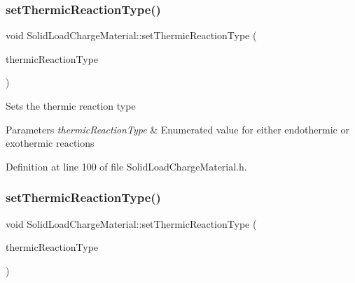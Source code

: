 \subsubsection{\texorpdfstring{set\+Thermic\+Reaction\+Type()}{setThermicReactionType()}\hspace{0.1cm}{\footnotesize\ttfamily [2/3]}}
{\footnotesize\ttfamily void Solid\+Load\+Charge\+Material\+::set\+Thermic\+Reaction\+Type (\begin{DoxyParamCaption}\item[{\hyperlink{class_load_charge_material_a51d4263e865a5d86236622dd3fe23fd1}{Load\+Charge\+Material\+::\+Thermic\+Reaction\+Type}}]{thermic\+Reaction\+Type }\end{DoxyParamCaption})\hspace{0.3cm}{\ttfamily [inline]}}

Sets the thermic reaction type 
\begin{DoxyParams}{Parameters}
{\em thermic\+Reaction\+Type} & Enumerated value for either endothermic or exothermic reactions \\
\hline
\end{DoxyParams}


Definition at line 100 of file Solid\+Load\+Charge\+Material.\+h.

\mbox{\label{class_solid_load_charge_material_ae2f85e0fbeff9f72b808bf86e645797f}} 
\subsubsection{\texorpdfstring{set\+Thermic\+Reaction\+Type()}{setThermicReactionType()}\hspace{0.1cm}{\footnotesize\ttfamily [3/3]}}
{\footnotesize\ttfamily void Solid\+Load\+Charge\+Material\+::set\+Thermic\+Reaction\+Type (\begin{DoxyParamCaption}\item[{\hyperlink{class_load_charge_material_a51d4263e865a5d86236622dd3fe23fd1}{Load\+Charge\+Material\+::\+Thermic\+Reaction\+Type}}]{thermic\+Reaction\+Type }\end{DoxyParamCaption})\hspace{0.3cm}{\ttfamily [inline]}}

